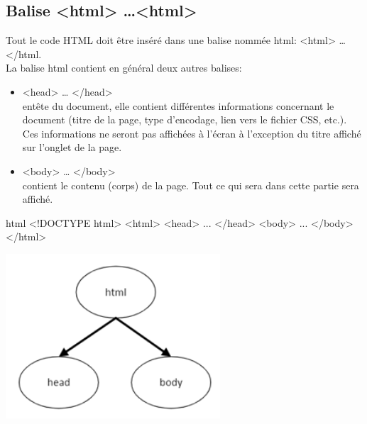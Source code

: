 \documentclass[a4paper,11pt]{article}
\begin{document}
\subsection{Balise <html> \dots <html>}
Tout le code HTML doit être inséré dans une balise nommée html: <html> … </html.\\
La balise html contient en général deux autres balises:
\begin{itemize}
\item <head> … </head>\\
entête du document, elle contient différentes informations concernant le document (titre de la page, type d'encodage, lien vers le fichier CSS, etc.).
Ces informations ne seront pas affichées à l'écran à l'exception du titre affiché sur l'onglet de la page.
\item <body> … </body>\\
contient le contenu (corps) de la page. Tout ce qui sera dans cette partie sera affiché.
\end{itemize}
\begin{multicols}{2}
\begin{code}{html}
<!DOCTYPE html>
<html>
  <head>
   ...
  </head>
  <body>
   ...
  </body>
</html>
\end{code}
\includegraphics[width=0.6\textwidth]{images/balise-html.png} \\
\end{multicols}

\newpage
\end{document}
